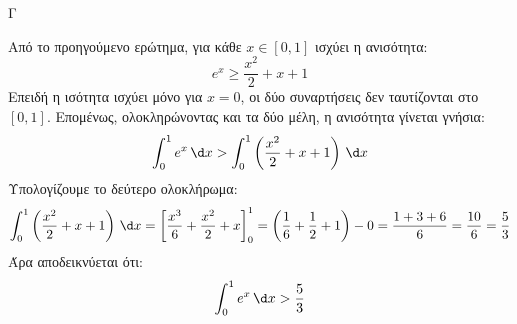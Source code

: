 \begin{thema}{Γ}
\begin{erwthma}
\item Από το προηγούμενο ερώτημα, για κάθε $x\in[0,1]$ ισχύει η ανισότητα:
\[e^x\geq \frac{x^2}{2}+x+1\]
Επειδή η ισότητα ισχύει μόνο για $x=0$, οι δύο συναρτήσεις δεν ταυτίζονται στο $[0,1]$. Επομένως, ολοκληρώνοντας και τα δύο μέλη, η ανισότητα γίνεται γνήσια:
\[\int_0^1 e^x\,\d x > \int_0^1 \left(\frac{x^2}{2}+x+1\right)\,\d x\]
Υπολογίζουμε το δεύτερο ολοκλήρωμα:
\[\int_0^1 \left(\frac{x^2}{2}+x+1\right)\,\d x = \left[\frac{x^3}{6}+\frac{x^2}{2}+x\right]_0^1 = \left(\frac{1}{6}+\frac{1}{2}+1\right) - 0 = \frac{1+3+6}{6} = \frac{10}{6} = \frac{5}{3}\]
Άρα αποδεικνύεται ότι:
\[\int_0^1 e^x\,\d x > \frac{5}{3}\]
\end{erwthma}
\end{thema}

